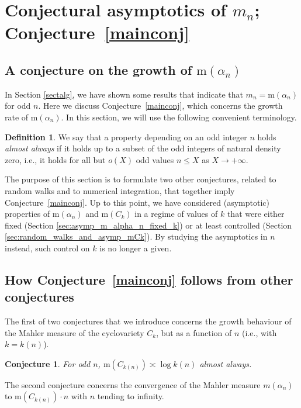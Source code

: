 \documentclass[12pt,reqno]{amsart}
\theoremstyle{definition}
\theoremstyle{plain}
\newtheorem{conjecture}[theorem]{Conjecture}
\theoremstyle{definition}
\newtheorem{definition}[theorem]{Definition}
\newcommand\m{\mathrm{m}}
\renewcommand{\leq}{\leqslant}
\begin{document}
\section{Conjectural asymptotics of $m_n$; Conjecture~\ref{mainconj}} 
\label{sectconj}


\subsection{A conjecture on the growth of $\m(\alpha_n)$} 

In Section \ref{sectalg}, we have shown some results that indicate that $m_n = \m(\alpha_n)$ for odd $n$. Here we discuss Conjecture~\ref{mainconj}, which concerns the growth rate of $\m(\alpha_n)$.
In this section, we will use the following convenient terminology. 
\begin{definition}
We say that a property depending on an odd integer $n$ holds \emph{almost always} if it holds up to a subset of the odd integers of natural density zero, i.e., it holds for all but $o(X)$ odd values $n \leq X$ as $X \rightarrow + \infty$. 
\end{definition} 

The purpose of this section is to formulate two other conjectures, related to random walks and to numerical integration, that together imply Conjecture~\ref{mainconj}. 
Up to this point, we have considered (asymptotic) properties of $\m(\alpha_n)$ and $\m(C_k)$ in a regime of values of $k$ that were either fixed (Section \ref{sec:asymp_m_alpha_n_fixed_k}) or at least controlled (Section \ref{sec:random_walks_and_asymp_mCk}). By studying the asymptotics in $n$ instead, such control on $k$ is no longer a given.


\subsection{How Conjecture~\ref{mainconj} follows from other conjectures}

The first of two conjectures that we introduce concerns the growth behaviour of the Mahler measure of the cyclovariety $C_k$, but as a function of $n$ (i.e., with $k=k(n)$). 

\begin{conjecture}
\label{con:mCk logk}
For odd $n$, $\m(C_{k(n)}) \asymp \log{k(n)}$ almost always.
\end{conjecture}

The second conjecture concerns the convergence of the Mahler measure $m(\alpha_n)$ to $\m(C_{k(n)}) \cdot n$ with $n$ tending to infinity. 
\end{document}
